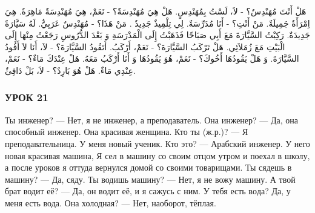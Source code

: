 \documentclass[a5paper]{article}
\begin{document}
هَلْ أَنْتَ مُهَنْدِسٌ؟ - لاَ، لَسْتُ بِمُهَنْدِسٍ. هَلْ هِيَ مُهَنْدِسَةٌ؟ - نَعَمْ، هِيَ مُهَنْدِسَةٌ مَاهِرَةٌ. هِيَ اِمْرَأَةٌ جَمِيلَةٌ. مَنْ أَنْتِ؟ - أَنَا مُدَرِّسَةٌ. لِي تِلْمِيذٌ جَدِيدٌ . مَنْ هَذَا؟ - مُهَنْدِسٌ عَرَبِيٌّ. لَهُ سَيَّارَةٌ جَدِيدَةٌ. رَكِبْتُ السَّيَّارَةَ مَعَ أَبِي صَبَاحًا فَذَهَبْتُ إِلَى الْمَدْرَسَةِ وَ بَعْدَ الدُّرُوسِ رَجَعْتُ مِنْهَا إِلَى الْبَيْتِ مَعَ زُمَلاَئِي. هَلْ تَرْكَبُ السَّيَّارَةَ؟ - نَعَمْ، أَرْكَبُ. أَتَقُودُ السَّيَّارَةَ؟ - لاَ، أَنَا لاَ أَقُودُ السَّيَّارَةَ. وَ هَلْ يَقُودُهَا أَخُوكَ؟ - نَعَمْ، هُوَ يَقُودُهَا وَ أَنَا أَرْكَبُ مَعَهُ. هَلْ عِنْدَكَ مَاءٌ؟ - نَعَمْ، عِنْدِي مَاءٌ. هَلْ هُوَ بَارِدٌ؟ - لاَ، بَلْ دَافِئٌ.

\subsubsection{УРОК 21}
Ты инженер? — Нет, я не инженер, а преподаватель. Она инже­нер? — Да, она способный инженер. Она красивая женщина. Кто ты (ж.р.)? — Я преподавательница. У меня новый ученик. Кто это? — Арабский инженер. У него новая красивая машина, Я сел в машину со своим отцом утром и поехал в школу, а после уроков я оттуда вернулся домой со своими товарищами. Ты сядешь в машину? — Да, сяду. Ты водишь машину? — Нет, я не вожу машину. А твой брат водит её? — Да, он водит её, и я сажусь с ним. У тебя есть во­да? Да, у меня есть вода. Она холодная? — Нет, наоборот, тёплая.‏
\end{document}
